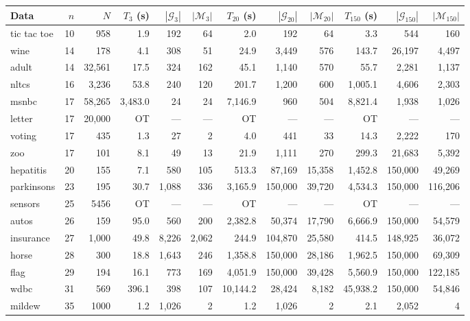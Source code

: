 \documentclass[letterpaper]{article}
\newcommand{\yc}{\cellcolor{yellow}}
\newcommand{\graphset}{\mathcal{G}}
\begin{document}
\begin{table}[!ht]
\centering
\small
\begin{tabular}{lrr||rrr||rrr||rrr}
Data & $n$ & $N$ & $T_{3}$ (s) & $|\graphset_{3}|$ & $|\mathcal{M}_{3}|$ & $T_{20}$ (s) & $|\graphset_{20}|$ & $|\mathcal{M}_{20}|$ & $T_{150}$ (s) & $|\graphset_{150}|$ & $|\mathcal{M}_{150}|$ \\
\hline
tic tac toe & 10 & 958 & 1.9 & 192 & 64 & 2.0 & 192 & 64 & 3.3 & 544 & 160 \\
wine & 14 & 178 & 4.1 & 308 & 51 & 24.9 & 3,449 & 576 & 143.7 & 26,197 & 4,497 \\
adult & 14 & 32,561 & 17.5 & 324 & 162 & 45.1 & 1,140 & 570 & 55.7 & 2,281 & 1,137 \\
nltcs & 16 & 3,236 & 53.8 & 240 & 120 & 201.7 & 1,200 & 600 & 1,005.1 & 4,606 & 2,303 \\
msnbc & 17 & 58,265 & 3,483.0 & 24 & 24 & 7,146.9 & 960 & 504 & 8,821.4 & 1,938 & 1,026 \\
letter & 17 & 20,000 & \yc OT & --- & --- & \yc OT & --- & --- & \yc OT & --- & --- \\
voting & 17 & 435 & 1.3 & 27 & 2 & 4.0 & 441 & 33 & 14.3 & 2,222 & 170 \\
zoo & 17 & 101 & 8.1 & 49 & 13 & 21.9 & 1,111 & 270 & 299.3 & 21,683 & 5,392 \\
hepatitis & 20 & 155 & 7.1 & 580 & 105 & 513.3 & 87,169 & 15,358 & 1,452.8 & 150,000 & 49,269 \\
parkinsons & 23 & 195 & 30.7 & 1,088 & 336 & 3,165.9 & 150,000 & 39,720 & 4,534.3 & 150,000 & 116,206 \\
sensors & 25 & 5456 & \yc OT & --- & --- & \yc OT & --- & --- & \yc OT & --- & --- \\
autos & 26 & 159 & 95.0 & 560 & 200 & 2,382.8 & 50,374 & 17,790 & 6,666.9 & 150,000 & 54,579 \\
insurance & 27 & 1,000 & 49.8 & 8,226 & 2,062 & 244.9 & 104,870 & 25,580 & 414.5 & 148,925 & 36,072 \\
horse & 28 & 300 & 18.8 & 1,643 & 246 & 1,358.8 & 150,000 & 28,186 & 1,962.5 & 150,000 & 69,309 \\
flag & 29 & 194 & 16.1 & 773 & 169 & 4,051.9 & 150,000 & 39,428 & 5,560.9 & 150,000 & 122,185 \\
wdbc & 31 & 569 & 396.1 & 398 & 107 & 10,144.2 & 28,424 & 8,182 & 45,938.2 & 150,000 & 54,846 \\
mildew & 35 & 1000 & 1.2 & 1,026 & 2 & 1.2 & 1,026 & 2 & 2.1 & 2,052 & 4 \\

\end{tabular}
\end{table}
\end{document}
